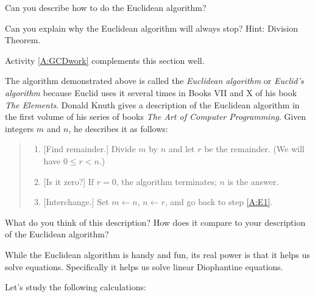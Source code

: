 \begin{question}
Can you describe how to do the Euclidean algorithm?
\end{question}
\QM

\begin{question}
Can you explain why the Euclidean algorithm will always stop? Hint:
Division Theorem.
\end{question}
\QM


\begin{activitynote}
Activity \ref{A:GCDwork} complements this section well.  %
\end{activitynote}


The algorithm demonstrated above is called the \textit{Euclidean
  algorithm} or \textit{Euclid's algorithm} because
Euclid uses it several times in Books VII and X of his
book \textit{The Elements}. Donald Knuth gives a
description of the Euclidean algorithm in the first volume of his
series of books \textit{The Art of Computer Programming}. Given
integers $m$ and $n$, he describes it as follows:
\begin{quote}
\begin{enumerate} 
\item\label{A:E1} [Find remainder.] Divide $m$ by $n$ and let $r$ be the remainder. (We will have $0\le r< n$.)
\item{[Is it zero?]} If $r=0$, the algorithm terminates; $n$ is the answer.
\item{[Interchange.]} Set $m \leftarrow n$, $n \leftarrow r$, and go
  back to step \ref{A:E1}.
\end{enumerate}
\end{quote}

\begin{question}
What do you think of this description? How does it compare to your
description of the Euclidean algorithm?
\end{question}
\QM

While the Euclidean algorithm is handy and fun, its real power is that
it helps us solve equations. Specifically it helps us solve 
linear Diophantine equations.

Let's study the following calculations:

